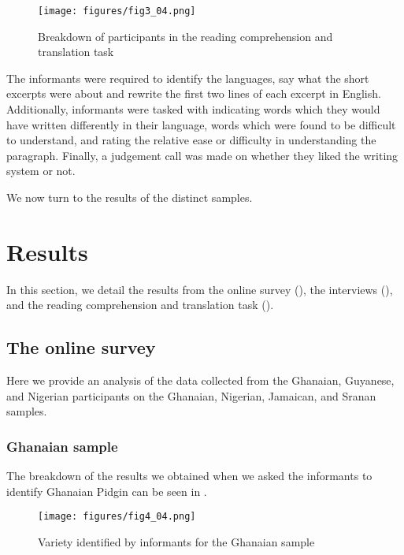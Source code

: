 \documentclass[output=paper,colorlinks,citecolor=brown]{langscibook}
\begin{document}
\begin{figure}
    \texttt{[image: figures/fig3\_04.png]}
    \caption{Breakdown of participants in the reading comprehension and translation task}
    \label{fig:fig3_04}
\end{figure}

The informants were required to identify the languages, say what the short excerpts were about and rewrite the first two lines of each excerpt in English. Additionally, informants were tasked with indicating words which they would have written differently in their language, words which were found to be difficult to understand, and rating the relative ease or difficulty in understanding the paragraph. Finally, a judgement call was made on whether they liked the writing system or not. 

We now turn to the results of the distinct samples.

\section{Results}\label{sec:04:3}
In this section, we detail the results from the online survey (), the interviews (), and the reading comprehension and translation task ().

\subsection{The online survey}\label{sec:04:3.1}

Here we provide an analysis of the data collected from the Ghanaian, Guyanese, and Nigerian participants on the Ghanaian, Nigerian, Jamaican, and Sranan samples.

\subsubsection{Ghanaian sample}

The breakdown of the results we obtained when we asked the informants to identify Ghanaian Pidgin can be seen in .

\begin{figure}
    \texttt{[image: figures/fig4\_04.png]}
    \caption{Variety identified by informants for the Ghanaian sample}
    \label{fig:fig4_04}
\end{figure}
\end{document}
